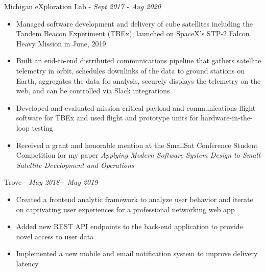 \documentclass[]{template}
\begin{document}
\begin{entrylist}
\entry
{Michigan eXploration Lab  - }
{\textit{Sept 2017 - Aug 2020}}
{
\vspace{-10pt}
\begin{itemize}[leftmargin=10pt, itemsep=-9pt, topsep=2pt]
    \item Managed software development and delivery of cube satellites including the Tandem Beacon Experiment (TBEx), launched on SpaceX's STP-2 Falcon Heavy Mission in June, 2019\\
    \item Built an end-to-end distributed communications pipeline that gathers satellite telemetry in orbit, schedules downlinks of the data to ground stations on Earth, aggregates the data for analysis, securely displays the telemetry on the web, and can be controlled via Slack integrations\\
    \item Developed and evaluated mission critical payload and communications flight software for TBEx and used flight and prototype units for hardware-in-the-loop testing\\
    \item Received a grant and honorable mention at the SmallSat Conference Student Competition for my paper \textit{Applying Modern Software System Design to Small Satellite Development and Operations}
\end{itemize}
}


\entry
{Trove - }
{\textit{May 2018 - May 2019}}
{
\vspace{-10pt}
\begin{itemize}[leftmargin=10pt, itemsep=-9pt, topsep=2pt]
    \item Created a frontend analytic framework to analyze user behavior and iterate on captivating user experiences for a professional networking web app\\
    \item Added new REST API endpoints to the back-end application to provide novel access to user data\\
    \item Implemented a new mobile and email notification system to improve delivery latency
\end{itemize}
}



\end{entrylist}
\end{document}
